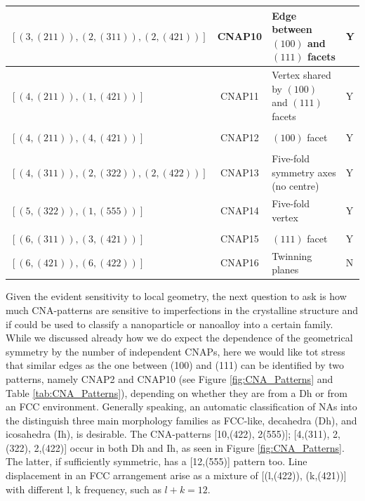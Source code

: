 \begin{table}
\begin{tabular}{lc|ll}
\\[-1em]
%
$[(3, (211)), (2, (311)), (2, (421))]$    &  CNAP10  & Edge between $(100)$ and $(111)$ facets & Y
\\ \hline
%
$[(4, (211)), (1, (421))]$  &  CNAP11 & Vertex shared by $(100)$ and $(111)$ facets & Y 
\\ \hline
\\[-1em]
%
$[(4, (211)), (4, (421))]$   &  CNAP12   & $(100)$ facet  & Y        
\\ \hline
\\[-1em]
%
$[(4, (311)), (2, (322)), (2, (422))]$ &  CNAP13  & Five-fold symmetry axes (no centre) & Y
\\ \hline
%
$[(5, (322)), (1, (555))]$    &  CNAP14   & Five-fold vertex & Y
\\ \hline
\\[-1em]
%
$[(6, (311)), (3, (421))]$ &  CNAP15 & $(111)$ facet  & Y
\\     \hline
%
$[(6, (421)), (6, (422))]$ &  CNAP16 & Twinning planes  & N 
\\     \hline
\end{tabular}
\end{table}
%

Given the evident sensitivity to local geometry, the next question to ask is how much CNA-patterns are sensitive to imperfections in the crystalline structure and if could be used to classify a nanoparticle or nanoalloy into a certain family.
While we discussed already how we do expect the dependence of the geometrical symmetry by the number of independent CNAPs, here we would like tot stress that similar edges as the one between (100) and (111) can be identified by two patterns, namely CNAP2 and CNAP10 (see Figure \ref{fig:CNA_Patterns} and Table \ref{tab:CNA_Patterns}), depending on whether they are from a Dh or from an FCC environment. 
%
Generally speaking, an automatic classification of NAs into the distinguish three main morphology families as FCC-like, decahedra (Dh), and icosahedra (Ih), is desirable. %
The CNA-patterns [10,(422), 2(555)]; [4,(311), 2,(322), 2,(422)] occur in both Dh and Ih, as seen in Figure \ref{fig:CNA_Patterns}. The latter, if sufficiently symmetric, has a [12,(555)] pattern too. 
Line displacement in an FCC arrangement arise as a mixture of [(l,(422)), (k,(421))] with different l, k frequency, such as $l+k=12$.


